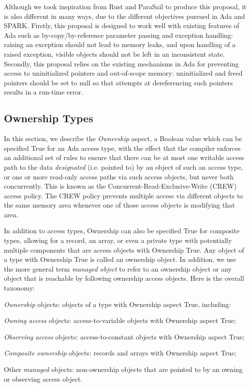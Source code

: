 \documentclass{llncs}
\begin{document}
Although we took inspiration from Rust and ParaSail to produce this proposal, it is also different in many ways, due to the different objectives pursued in Ada and SPARK. Firstly,
this proposal is designed to work well with existing features of Ada such as by-copy/by-reference parameter passing and exception handling: raising an exception should not lead to
memory leaks, and upon handling of a raised exception, visible objects should not be left in an inconsistent state. Secondly, this proposal relies on the existing mechanisms in Ada
for preventing access to uninitialized pointers and out-of-scope memory: uninitialized and freed pointers should be set to null so that attempts at dereferencing such pointers results in a run-time error.


\subsection{Ownership Types}
\label{sec:ownership}

In this section, we describe the \textit{Ownership} aspect, a Boolean value which can be specified True for an Ada access type, with the effect that the compiler enforces an additional set of rules to ensure that there can be at most one writable access path to the data
\textit{designated} (i.e. pointed to) by an object of such an access type, or one or more read-only access paths via such access objects, but never both concurrently. This is known as
the Concurrent-Read-Exclusive-Write (CREW) access policy. The CREW policy prevents multiple access via different objects to the same memory area whenever one
of those access objects is modifying that area.

\smallskip
In addition to access types, Ownership can also be specified True for composite types, allowing for a record, an array, or even a private type with potentially multiple components that are access objects with Ownership True.  Any object of a type with Ownership True is called an ownership object.
In addition, we use the more general term \textit{managed object} to refer to an ownership object or any object that is reachable by following ownership access objects.
Here is the overall taxonomy:

\begin{compactitem}
\item \textit{Ownership} objects: objects of a type with Ownership aspect True, including:
    \begin{compactitem}
\item \textit{Owning access} objects: access-to-variable objects with Ownership aspect True;
\item \textit{Observing access} objects: access-to-constant objects with Ownership aspect True;
\item \textit{Composite ownership} objects: records and arrays with Ownership aspect True;
    \end{compactitem}
\item Other \textit{managed} objects: non-ownership objects that are pointed to by an owning or observing access object.
\end{compactitem}
\end{document}
